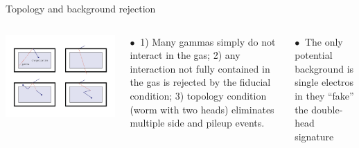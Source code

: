 \documentclass [aspectratio=169]{beamer}
\begin{document}
\begin{frame}{Topology and background rejection}

\begin{columns}
\includegraphics[scale=0.25]{geom_rejection.png}


$\bullet~$ 1) Many gammas simply do not interact in the gas; 2) any interaction not fully contained in the gas is rejected by the fiducial condition; 3) topology condition (worm with two heads) eliminates multiple side and pileup events. 

$\bullet~$ The only potential background is single electros in they ``fake'' the double-head signature 

\end{columns}
\end{frame}
\end{document}
